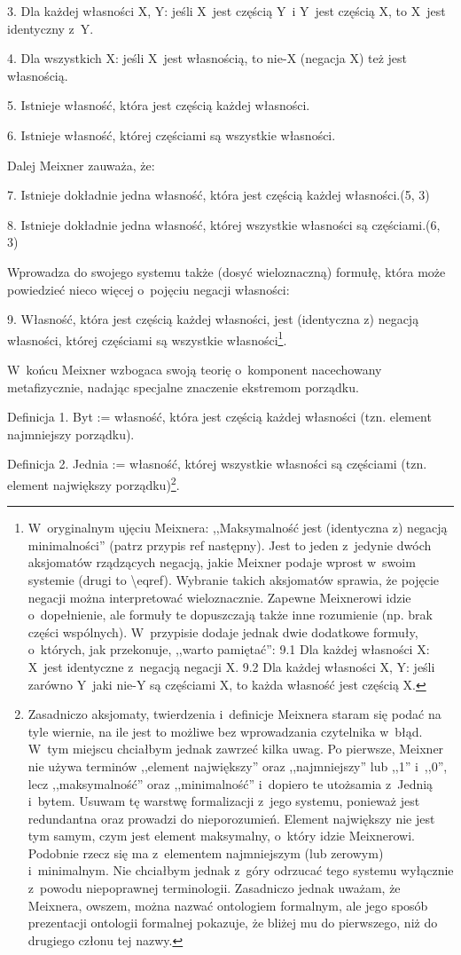 3. Dla każdej własności X, Y: jeśli X~jest częścią Y~i Y~jest częścią X, to X~jest identyczny z~Y.

4. Dla wszystkich X: jeśli X~jest własnością, to nie-X (negacja X) też jest własnością.

5. Istnieje własność, która jest częścią każdej własności.

6. Istnieje własność, której częściami są wszystkie własności.

Dalej Meixner zauważa, że:

7. Istnieje dokładnie jedna własność, która jest częścią każdej własności.(5, 3)

8. Istnieje dokładnie jedna własność, której wszystkie własności są częściami.(6, 3)

Wprowadza do swojego systemu także (dosyć wieloznaczną) formułę, która może powiedzieć nieco więcej o~pojęciu negacji własności:

9. Własność, która jest częścią każdej własności, jest (identyczna z) negacją własności, której częściami są wszystkie własności\footnote{W~oryginalnym ujęciu Meixnera: ,,Maksymalność jest (identyczna z) negacją minimalności'' (patrz przypis ref następny). Jest to jeden z~jedynie dwóch aksjomatów rządzących negacją, jakie Meixner podaje wprost w~swoim systemie (drugi to {\textbackslash}eqref). Wybranie takich aksjomatów sprawia, że pojęcie negacji można interpretować wieloznacznie. Zapewne Meixnerowi idzie o~dopełnienie, ale formuły te dopuszczają także inne rozumienie (np. brak części wspólnych). W~przypisie dodaje jednak dwie dodatkowe formuły, o~których, jak przekonuje, ,,warto pamiętać'': 9.1 Dla każdej własności X: X~jest identyczne z~negacją negacji X. 9.2 Dla każdej własności X, Y: jeśli zarówno Y~jaki nie-Y są częściami X, to każda własność jest częścią X.}.

W~końcu Meixner wzbogaca swoją teorię o~komponent nacechowany metafizycznie, nadając specjalne znaczenie ekstremom porządku.

Definicja 1. Byt := własność, która jest częścią każdej własności (tzn. element najmniejszy porządku).

Definicja 2. Jednia := własność, której wszystkie własności są częściami (tzn. element największy porządku)\footnote{Zasadniczo aksjomaty, twierdzenia i~definicje Meixnera staram się podać na tyle wiernie, na ile jest to możliwe bez wprowadzania czytelnika w~błąd. W~tym miejscu chciałbym jednak zawrzeć kilka uwag. Po pierwsze, Meixner nie używa terminów ,,element największy'' oraz ,,najmniejszy'' lub ,,1'' i~,,0'', lecz ,,maksymalność'' oraz ,,minimalność'' i~dopiero te utożsamia z~Jednią i~bytem. Usuwam tę warstwę formalizacji z~jego systemu, ponieważ jest redundantna oraz prowadzi do nieporozumień. Element największy nie jest tym samym, czym jest element maksymalny, o~który idzie Meixnerowi. Podobnie rzecz się ma z~elementem najmniejszym (lub zerowym) i~minimalnym. Nie chciałbym jednak z~góry odrzucać tego systemu wyłącznie z~powodu niepoprawnej terminologii. Zasadniczo jednak uważam, że Meixnera, owszem, można nazwać ontologiem formalnym, ale jego sposób prezentacji ontologii formalnej pokazuje, że bliżej mu do pierwszego, niż do drugiego członu tej nazwy.}.

